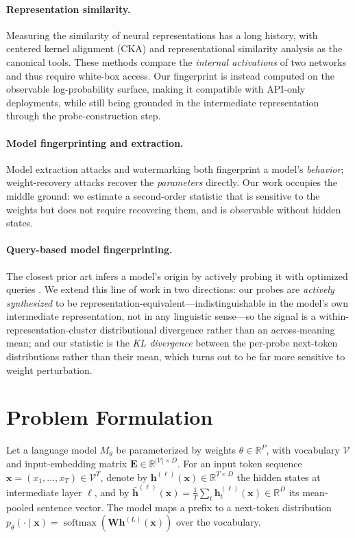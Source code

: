 \documentclass[11pt]{article}
\newcommand{\R}{\mathbb{R}}
\newcommand{\V}{\mathcal{V}}
\newcommand{\softmax}{\operatorname{softmax}}
\theoremstyle{definition}
\begin{document}
\paragraph{Representation similarity.}
Measuring the similarity of neural representations has a long history, with
centered kernel alignment (CKA) \citep{cka} and representational similarity
analysis \citep{rsa} as the canonical tools. These methods compare the
\emph{internal activations} of two networks and thus require white-box access.
Our fingerprint is instead computed on the observable log-probability surface,
making it compatible with API-only deployments, while still being grounded in
the intermediate representation through the probe-construction step.

\paragraph{Model fingerprinting and extraction.}
Model extraction attacks \citep{modelsteal} and watermarking
\citep{watermark} both fingerprint a model's \emph{behavior}; weight-recovery
attacks \citep{rolnick} recover the \emph{parameters} directly. Our work
occupies the middle ground: we estimate a second-order statistic that is
sensitive to the weights but does not require recovering them, and is
observable without hidden states.

\paragraph{Query-based model fingerprinting.}
The closest prior art infers a model's origin by actively probing it with
optimized queries \citep{teacherfingerprint}. We extend this line of work in
two directions: our probes are \emph{actively synthesized} to be
representation-equivalent---indistinguishable in the model's own intermediate
representation, not in any linguistic sense---so the signal is a
within-representation-cluster distributional divergence rather than an
across-meaning mean; and our statistic is the \emph{KL divergence} between the
per-probe next-token distributions rather than their mean, which turns out to
be far more sensitive to weight perturbation.

\section{Problem Formulation}
\label{sec:form}

Let a language model $M_\theta$ be parameterized by weights $\theta \in \R^P$,
with vocabulary $\V$ and input-embedding matrix $\bm{E} \in \R^{|\V| \times D}$.
For an input token sequence $\bm{x} = (x_1, \dots, x_T) \in \V^T$, denote by
$\bm{h}^{(\ell)}(\bm{x}) \in \R^{T \times D}$ the hidden states at intermediate
layer $\ell$, and by $\bar{\bm{h}}^{(\ell)}(\bm{x}) = \frac1T
\sum_t \bm{h}^{(\ell)}_t(\bm{x}) \in \R^D$ its mean-pooled sentence vector.
The model maps a prefix to a next-token distribution
$p_\theta(\cdot \mid \bm{x}) = \softmax(\bm{W} \bm{h}^{(L)}(\bm{x}))$ over the
vocabulary.
\end{document}
